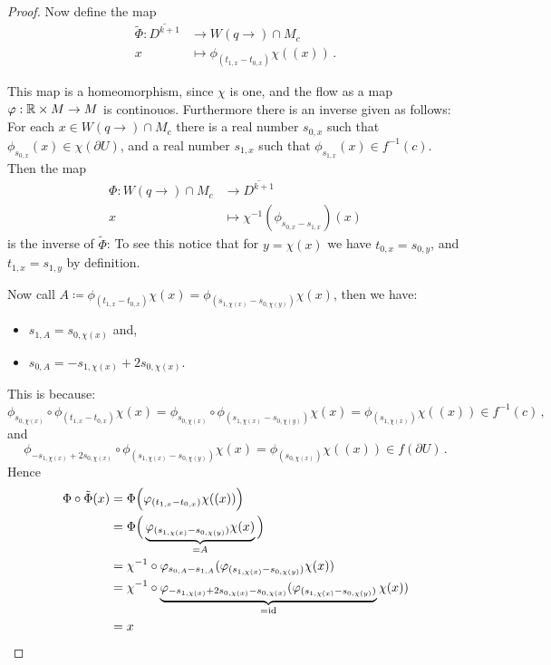 \begin{proof}
Now define the map
\begin{align*}
	\tilde{\Phi}:	\overline {D^{k+1}}			&\to 		W(q\to)\cap M_c\\
	x				&\mapsto	\phi_{(t_{1,x}-t_{0,x})}\chi((x)) \, .
\end{align*}


This map is a homeomorphism, since $\chi$ is one, and the flow as a map $\varphi: \mathbb{R} \times M \to M$ is continouos. Furthermore there is an inverse given as follows: For each $x\in W(q\to)\cap M_c$ there is a real number $s_{0,x}$ such that $\phi_{s_{0,x}}(x)\in \chi(\partial U)$, and a real number $s_{1,x}$ such that $\phi_{s_{1,x}}(x)\in f^{-1}(c)$. Then the map 
\begin{align*}
	\Phi: W(q\to)\cap M_c 	&\to     \overline {D^{k+1}} \\
	x						&\mapsto \chi^{-1}(\phi_{s_{0,x}-s_{1,x}})(x)
\end{align*}
is the inverse of $\tilde{\Phi}$: To see this notice that for $y=\chi(x)$ we have $t_{0,x}=s_{0,y}$, and $t_{1,x}=s_{1,y}$ by definition. 



Now call $A\coloneq  \phi_{(t_{1,x}-t_{0,x})}\chi(x)=\phi_{(s_{1,\chi(x)}-s_{0,\chi(y)})}\chi(x)$, then we have:
\begin{itemize}
	\item $s_{1,A}=s_{0,\chi(x)}$ and,
	\item $s_{0,A}=-s_{1,\chi(x)}+2s_{0,\chi(x)}$.
\end{itemize}
This is because:
\begin{equation*}
	\phi_{s_{0,\chi(x)}}\circ \phi_{(t_{1,x}-t_{0,x})}\chi(x)=\phi_{s_{0,\chi(x)}}\circ  \phi_{(s_{1,\chi(x)}-s_{0,\chi(y)})}\chi(x)= \phi_{(s_{1,\chi(x)})}\chi((x)) \in f^{-1}(c)\, ,
\end{equation*} 
and 
\begin{equation*}
	\phi_{-s_{1,\chi(x)}+2s_{0,\chi(x)}}\circ \phi_{(s_{1,\chi(x)}-s_{0,\chi(y)})}\chi(x)= \phi_{(s_{0,\chi(x)})}\chi((x)) \in f(\partial U)\, .
\end{equation*} 
Hence  
\begin{align*}
	\Phi \circ \tilde{\Phi}(x)
	&= 	\Phi\Big( \varphi_{(t_{1,x}-t_{0,x})}\chi((x)) \Big) \\
	&= 	\Phi\Big( \underbrace{\varphi_{(s_{1,\chi(x)}-s_{0,\chi(y)})}\chi(x)}_{=A} \Big) \\
	&=  \chi^{-1}\circ \varphi_{s_{0,A}-s_{1,A}}(\varphi_{(s_{1,\chi(x)}-s_{0,\chi(y)})}\chi(x)) \\
	&=  \chi^{-1}\circ \underbrace{\varphi_{-s_{1,\chi(x)}+2s_{0,\chi(x)} -s_{0,\chi(x)} }(\varphi_{(s_{1,\chi(x)}-s_{0,\chi(y)})}}_{=\text{id}}\chi(x)) \\
	&=  x
\end{align*}


\end{proof}
